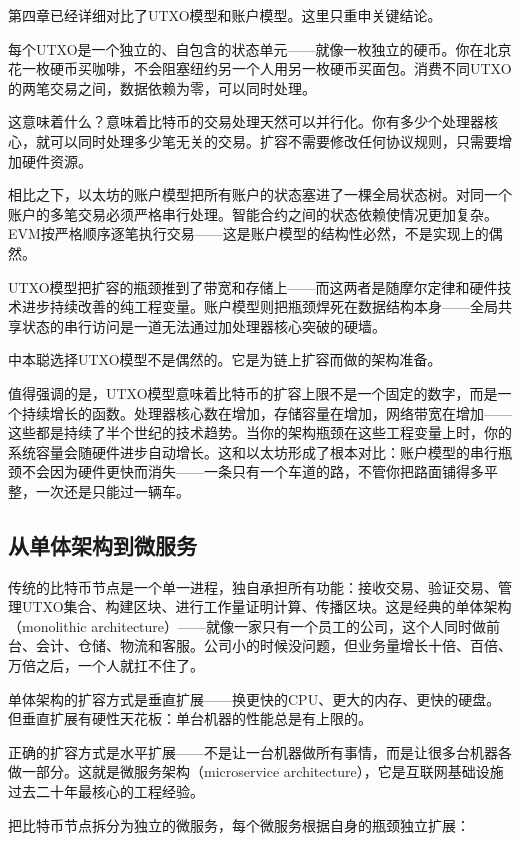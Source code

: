 \documentclass[a4paper,12pt,openany]{ctexbook}
\begin{document}
第四章已经详细对比了UTXO模型和账户模型。这里只重申关键结论。

每个UTXO是一个独立的、自包含的状态单元——就像一枚独立的硬币。你在北京花一枚硬币买咖啡，不会阻塞纽约另一个人用另一枚硬币买面包。消费不同UTXO的两笔交易之间，数据依赖为零，可以同时处理。

这意味着什么？意味着比特币的交易处理天然可以并行化。你有多少个处理器核心，就可以同时处理多少笔无关的交易。扩容不需要修改任何协议规则，只需要增加硬件资源。

相比之下，以太坊的账户模型把所有账户的状态塞进了一棵全局状态树。对同一个账户的多笔交易必须严格串行处理。智能合约之间的状态依赖使情况更加复杂。EVM按严格顺序逐笔执行交易——这是账户模型的结构性必然，不是实现上的偶然。

UTXO模型把扩容的瓶颈推到了带宽和存储上——而这两者是随摩尔定律和硬件技术进步持续改善的纯工程变量。账户模型则把瓶颈焊死在数据结构本身——全局共享状态的串行访问是一道无法通过加处理器核心突破的硬墙。

中本聪选择UTXO模型不是偶然的。它是为链上扩容而做的架构准备。

值得强调的是，UTXO模型意味着比特币的扩容上限不是一个固定的数字，而是一个持续增长的函数。处理器核心数在增加，存储容量在增加，网络带宽在增加——这些都是持续了半个世纪的技术趋势。当你的架构瓶颈在这些工程变量上时，你的系统容量会随硬件进步自动增长。这和以太坊形成了根本对比：账户模型的串行瓶颈不会因为硬件更快而消失——一条只有一个车道的路，不管你把路面铺得多平整，一次还是只能过一辆车。


\subsection*{从单体架构到微服务}


传统的比特币节点是一个单一进程，独自承担所有功能：接收交易、验证交易、管理UTXO集合、构建区块、进行工作量证明计算、传播区块。这是经典的单体架构（monolithic architecture）——就像一家只有一个员工的公司，这个人同时做前台、会计、仓储、物流和客服。公司小的时候没问题，但业务量增长十倍、百倍、万倍之后，一个人就扛不住了。

单体架构的扩容方式是垂直扩展——换更快的CPU、更大的内存、更快的硬盘。但垂直扩展有硬性天花板：单台机器的性能总是有上限的。

正确的扩容方式是水平扩展——不是让一台机器做所有事情，而是让很多台机器各做一部分。这就是微服务架构（microservice architecture），它是互联网基础设施过去二十年最核心的工程经验。

把比特币节点拆分为独立的微服务，每个微服务根据自身的瓶颈独立扩展：
\end{document}
